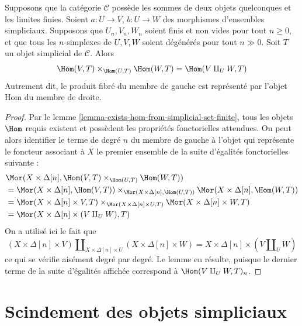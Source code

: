 \begin{lemma}
\label{lemma-hom-from-coprod}
Supposons que la catégorie $\mathcal{C}$ possède les sommes de deux
objets quelconques et les limites finies. Soient
$a : U \to V$, $b : U \to W$ des morphismes d'ensembles simpliciaux.
Supposons que $U_n, V_n, W_n$ soient finis et non vides pour tout
$n \geq 0$, et que tous les $n$-simplexes de $U, V, W$ soient dégénérés
pour tout $n \gg 0$.
Soit $T$ un objet simplicial de $\mathcal{C}$. Alors
$$
\Hom(V, T) \times_{\Hom(U, T)} \Hom(W, T)
=
\Hom(V \amalg_U W, T)
$$
Autrement dit, le produit fibré du membre de gauche est représenté par
l'objet Hom du membre de droite.
\end{lemma}

\begin{proof}
Par le lemme \ref{lemma-exists-hom-from-simplicial-set-finite}, tous les
objets $\Hom$ requis existent et possèdent les propriétés fonctorielles
attendues. On peut alors identifier le terme de degré $n$ du membre de
gauche à l'objet qui représente le foncteur associant à $X$ le premier
ensemble de la suite d'égalités fonctorielles suivante :
\begin{align*}
&
\Mor(X \times \Delta[n],
\Hom(V, T) \times_{\Hom(U, T)} \Hom(W, T)) \\
& =
\Mor(X \times \Delta[n], \Hom(V, T))
\times_{\Mor(X \times \Delta[n], \Hom(U, T))}
\Mor(X \times \Delta[n], \Hom(W, T)) \\
& =
\Mor(X \times \Delta[n] \times V, T)
\times_{\Mor(X \times \Delta[n] \times U, T)}
\Mor(X \times \Delta[n] \times W, T) \\
& =
\Mor(X \times \Delta[n] \times (V \amalg_U W), T)
\end{align*}
On a utilisé ici le fait que
$$
(X \times \Delta[n] \times V)
\amalg_{X \times \Delta[n] \times U}
(X \times \Delta[n] \times W)
=
X \times \Delta[n] \times (V \amalg_U W)
$$
ce qui se vérifie aisément degré par degré. Le lemme en résulte, puisque
le dernier terme de la suite d'égalités affichée correspond à
$\Hom(V \amalg_U W, T)_n$.
\end{proof}













\section{Scindement des objets simpliciaux}
\label{section-splitting}

